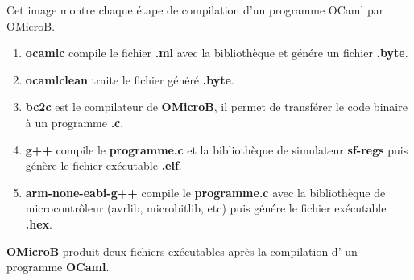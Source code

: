 \documentclass[14px]{article}
\begin{document}
\begin{figureStructure de OmicroB}

\end{figureStructure de OmicroB}

Cet image montre chaque étape de compilation d'un programme OCaml par OMicroB.
\begin{enumerate}
    \item \textbf{ocamlc} compile le fichier \textbf{.ml} avec la bibliothèque et génére un fichier \textbf{.byte}.
    \item \textbf{ocamlclean} traite le fichier généré \textbf{.byte}.
    \item \textbf{bc2c} est le compilateur de \textbf{OMicroB}, il permet de transférer le code binaire à un programme \textbf{.c}.
    \item \textbf{g++} compile le \textbf{programme.c} et la bibliothèque de simulateur \textbf{sf-regs} puis génère le fichier exécutable \textbf{.elf}.
    \item \textbf{arm-none-eabi-g++} compile le \textbf{programme.c} avec la bibliothèque de microcontrôleur (avrlib, microbitlib, etc) puis génére le fichier exécutable \textbf{.hex}.\\
\end{enumerate}

\textbf{OMicroB} produit deux fichiers exécutables après la compilation d'  un programme \textbf{OCaml}.
\end{document}
